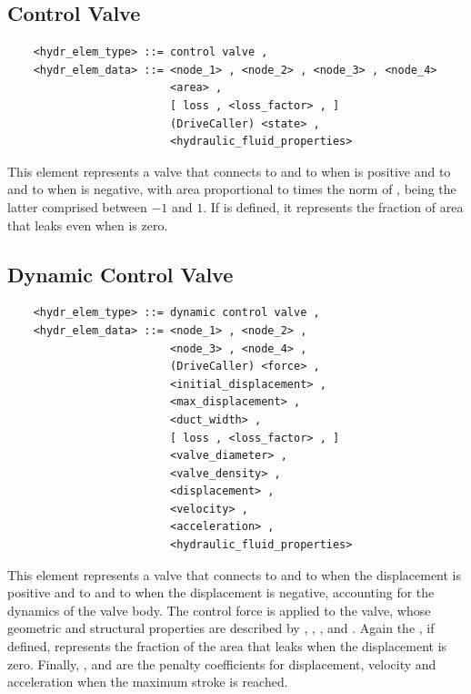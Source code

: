 \subsection{Control Valve}
\begin{verbatim}
    <hydr_elem_type> ::= control valve ,
    <hydr_elem_data> ::= <node_1> , <node_2> , <node_3> , <node_4>
                         <area> ,
                         [ loss , <loss_factor> , ]
                         (DriveCaller) <state> ,
                         <hydraulic_fluid_properties>
\end{verbatim}
This element represents a valve that connects
 to  and  to 
when  is positive and  to 
and  to  when  is negative,
with area proportional to  times the norm of , 
being the latter comprised between $-1$ and $1$.
If  is defined, it represents the fraction
of area that leaks even when  is zero.



\subsection{Dynamic Control Valve}\label{sec:EL:HYDR:DYNAMIC_CONTROL_VALVE}
\begin{verbatim}
    <hydr_elem_type> ::= dynamic control valve ,
    <hydr_elem_data> ::= <node_1> , <node_2> ,
                         <node_3> , <node_4> ,
                         (DriveCaller) <force> ,
                         <initial_displacement> ,
                         <max_displacement> ,
                         <duct_width> ,
                         [ loss , <loss_factor> , ]
                         <valve_diameter> ,
                         <valve_density> ,
                         <displacement> ,
                         <velocity> ,
                         <acceleration> ,
                         <hydraulic_fluid_properties>
\end{verbatim}
This element represents a valve that connects
 to  and  to 
when the displacement is positive and  to 
and  to  when the displacement is negative,
accounting for the dynamics of the valve body.
The control force  is applied to the valve, whose 
geometric and structural properties are described by 
, ,
,  and .
Again the , if defined, represents the fraction
of the area that leaks when the displacement is zero.
Finally, ,  and 
are the penalty coefficients for displacement, velocity and acceleration
when the maximum stroke is reached.




